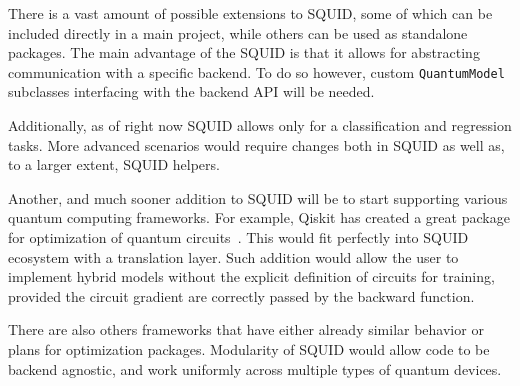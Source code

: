 There is a vast amount of possible extensions to SQUID, some of which can be included directly in a main project, while others can be used as standalone packages.
The main advantage of the SQUID is that it allows for abstracting communication with a specific backend.
To do so however, custom \texttt{QuantumModel} subclasses interfacing with the backend API will be needed.

Additionally, as of right now SQUID allows only for a classification and regression tasks.
More advanced scenarios would require changes both in SQUID as well as, to a larger extent, SQUID helpers.

Another, and much sooner addition to SQUID will be to start supporting various quantum computing frameworks.
For example, Qiskit has created a great package for optimization of quantum circuits~\cite{Qiskit}.
This would fit perfectly into SQUID ecosystem with a translation layer.
Such addition would allow the user to implement hybrid models without the explicit definition of circuits for training, provided the circuit gradient are correctly passed by the backward function.

There are also others frameworks that have either already similar behavior or plans for optimization packages.
Modularity of SQUID would allow code to be backend agnostic, and work uniformly across multiple types of quantum devices.
